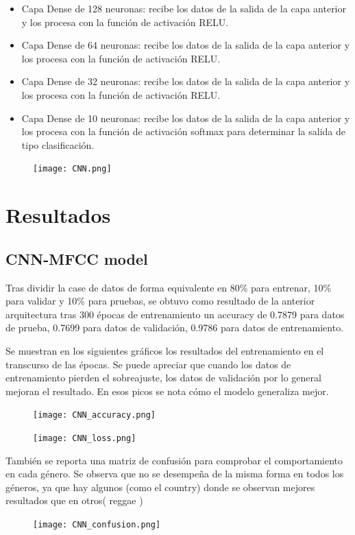 \documentclass[colorinlistoftodos,twoside,twocolumn,10pt]{article} %
\begin{document}
\begin{itemize}
\item Capa Dense de 128 neuronas: recibe los datos de la salida de la capa anterior y los procesa con la función de activación RELU.

\item Capa Dense de 64 neuronas: recibe los datos de la salida de la capa anterior y los procesa con la función de activación RELU.

\item Capa Dense de 32 neuronas: recibe los datos de la salida de la capa anterior y los procesa con la función de activación RELU.

\item Capa Dense de 10 neuronas: recibe los datos de la salida de la capa anterior y los procesa con la función de activación softmax para determinar la salida de tipo clasificación.
\end{itemize}

\begin{figure}
\texttt{[image: CNN.png]}
\end{figure}

\section{Resultados}
\subsection {CNN-MFCC model}
Tras dividir la case de datos de forma equivalente en 80\% para entrenar, 10\% para validar y 10\% para pruebas, se obtuvo como resultado de la anterior arquitectura tras 300 épocas de entrenamiento un accuracy de 0.7879 para datos de prueba, 0.7699 para datos de validación, 0.9786 para datos de entrenamiento.

Se muestran en los siguientes gráficos los resultados del entrenamiento en el transcurso de las épocas. Se puede apreciar que cuando los datos de entrenamiento pierden el sobreajuste, los datos de validación por lo general mejoran el resultado. En esos picos se nota cómo el modelo generaliza mejor.
  \begin{figure}
  \texttt{[image: CNN\_accuracy.png]}
  \end{figure}
  \begin{figure}
  \texttt{[image: CNN\_loss.png]}
  \end{figure}

También se reporta una matriz de confusión para comprobar
el comportamiento en cada género. Se observa que no
se desempeña de la misma forma en todos los géneros,
ya que hay algunos (como el country) donde se
observan mejores resultados que en otros( reggae )
\begin{figure}
\texttt{[image: CNN\_confusion.png]}
\end{figure}
\end{document}
